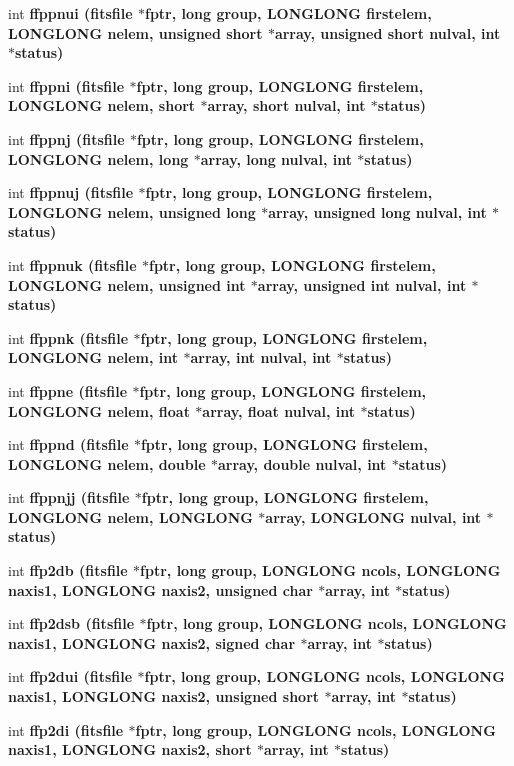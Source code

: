 \begin{CompactItemize}
\item 
int \bf{ffppnui} (\bf{fitsfile} $\ast$fptr, long group, \bf{LONGLONG} firstelem, \bf{LONGLONG} nelem, unsigned short $\ast$array, unsigned short nulval, int $\ast$status)
\item 
int \bf{ffppni} (\bf{fitsfile} $\ast$fptr, long group, \bf{LONGLONG} firstelem, \bf{LONGLONG} nelem, short $\ast$array, short nulval, int $\ast$status)
\item 
int \bf{ffppnj} (\bf{fitsfile} $\ast$fptr, long group, \bf{LONGLONG} firstelem, \bf{LONGLONG} nelem, long $\ast$array, long nulval, int $\ast$status)
\item 
int \bf{ffppnuj} (\bf{fitsfile} $\ast$fptr, long group, \bf{LONGLONG} firstelem, \bf{LONGLONG} nelem, unsigned long $\ast$array, unsigned long nulval, int $\ast$status)
\item 
int \bf{ffppnuk} (\bf{fitsfile} $\ast$fptr, long group, \bf{LONGLONG} firstelem, \bf{LONGLONG} nelem, unsigned int $\ast$array, unsigned int nulval, int $\ast$status)
\item 
int \bf{ffppnk} (\bf{fitsfile} $\ast$fptr, long group, \bf{LONGLONG} firstelem, \bf{LONGLONG} nelem, int $\ast$array, int nulval, int $\ast$status)
\item 
int \bf{ffppne} (\bf{fitsfile} $\ast$fptr, long group, \bf{LONGLONG} firstelem, \bf{LONGLONG} nelem, float $\ast$array, float nulval, int $\ast$status)
\item 
int \bf{ffppnd} (\bf{fitsfile} $\ast$fptr, long group, \bf{LONGLONG} firstelem, \bf{LONGLONG} nelem, double $\ast$array, double nulval, int $\ast$status)
\item 
int \bf{ffppnjj} (\bf{fitsfile} $\ast$fptr, long group, \bf{LONGLONG} firstelem, \bf{LONGLONG} nelem, \bf{LONGLONG} $\ast$array, \bf{LONGLONG} nulval, int $\ast$status)
\item 
int \bf{ffp2db} (\bf{fitsfile} $\ast$fptr, long group, \bf{LONGLONG} ncols, \bf{LONGLONG} naxis1, \bf{LONGLONG} naxis2, unsigned char $\ast$array, int $\ast$status)
\item 
int \bf{ffp2dsb} (\bf{fitsfile} $\ast$fptr, long group, \bf{LONGLONG} ncols, \bf{LONGLONG} naxis1, \bf{LONGLONG} naxis2, signed char $\ast$array, int $\ast$status)
\item 
int \bf{ffp2dui} (\bf{fitsfile} $\ast$fptr, long group, \bf{LONGLONG} ncols, \bf{LONGLONG} naxis1, \bf{LONGLONG} naxis2, unsigned short $\ast$array, int $\ast$status)
\item 
int \bf{ffp2di} (\bf{fitsfile} $\ast$fptr, long group, \bf{LONGLONG} ncols, \bf{LONGLONG} naxis1, \bf{LONGLONG} naxis2, short $\ast$array, int $\ast$status)

\end{CompactItemize}
